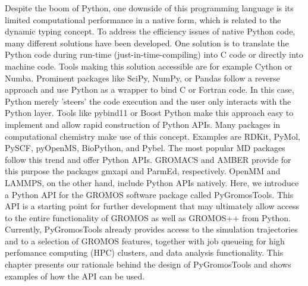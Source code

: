 Despite the boom of Python, one downside of this programming language is its limited computational performance in a native form, which is related to the dynamic typing concept. To address the efficiency issues of native Python code, many different solutions have been developed. One solution is to translate the Python code during run-time (just-in-time-compiling) into C code\cite{Kernighan2006} or directly into machine code\cite{Lattner2008}. Tools making this solution accessible are for example Cython\cite{Behnel2011} or Numba\cite{Lam2015}. 
Prominent packages like SciPy\cite{Vanderwalt2011}, NumPy\cite{Virtanen2020}, or Pandas\cite{Mckinney2010} follow a reverse approach and use Python as a wrapper to bind C or Fortran code. In this case, Python merely 'steers' the code execution and the user only interacts with the Python layer.\cite{Oliphant2007} 
Tools like pybind11\cite{Wenzel2017} or Boost Python\cite{Koranne2011} make this approach easy to implement and allow rapid construction of Python APIs. 
Many packages in computational chemistry make use of this concept. Examples are RDKit\cite{Landrum2021}, PyMol\cite{Delano2020}, PySCF\cite{Sun2018}, pyOpenMS\cite{Roest2014}, BioPython\cite{Cock2009}, and Pybel\cite{O'Boyle2008}. The most popular MD packages follow this trend and offer Python APIs. GROMACS \cite{Berendsen1995, Lindahl2001, Abraham2015} and AMBER\cite{Weiner1981, Pearlman1995, Case2005} provide for this purpose the packages gmxapi\cite{Irrgang2018} and ParmEd\cite{Shirts2017}, respectively. OpenMM\cite{Friedrichs2009, Eastman2010, Eastman2017} and LAMMPS,\cite{plimpton1995, Thompson2022} on the other hand, include Python APIs natively.\cite{Talirz2021}
Here, we introduce a Python API for the GROMOS software package \cite{Schmid2012} called PyGromosTools.\cite{Lehner2021} This API is a starting point for further development that may ultimately allow access to the entire functionality of GROMOS as well as GROMOS++ \cite{Eichenberger2011} from Python. Currently, PyGromosTools already provides access to the simulation trajectories and to a selection of GROMOS features, together with job queueing for high perfomance computing (HPC) clusters, and data analysis functionality. This chapter presents our rationale behind the design of PyGromosTools and shows examples of how the API can be used.



\FloatBarrier